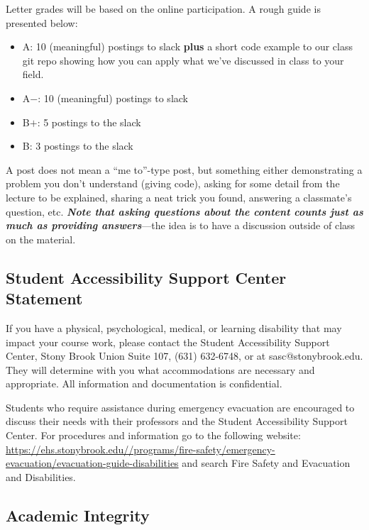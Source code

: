 \documentclass[10pt]{article}
\begin{document}
\noindent Letter grades will be based on the online participation.  A
rough guide is presented below:
\begin{itemize}
\item {\sf A\phantom{+}}: 10 (meaningful) postings to slack {\bf plus}
  a short code example to our class git repo showing how you can apply what
  we've discussed in class to your field.

\item {\sf A$-$}: 10 (meaningful) postings to slack

\item {\sf B$+$}: 5 postings to the slack

\item {\sf B\phantom{+}}:  3 postings to the slack
\end{itemize}
A post does not mean a ``me to''-type post, but something either
demonstrating a problem you don't understand (giving code), asking for
some detail from the lecture to be explained, sharing a neat trick you
found, answering a classmate's question, etc.  {\em \bfseries Note that asking
questions about the content counts just as much as providing
answers}---the idea is to have a discussion outside of class on the
material.



\subsection*{Student Accessibility Support Center Statement}

If you have a physical, psychological, medical, or learning disability
that may impact your course work, please contact the Student
Accessibility Support Center, Stony Brook Union Suite 107, (631)
632-6748, or at sasc@stonybrook.edu. They will determine with you what
accommodations are necessary and appropriate. All information and
documentation is confidential.

Students who require assistance during emergency evacuation are
encouraged to discuss their needs with their professors and the
Student Accessibility Support Center. For procedures and information
go to the following website:\\
{\small \url{https://ehs.stonybrook.edu//programs/fire-safety/emergency-evacuation/evacuation-guide-disabilities}}\linebreak
and search Fire Safety and Evacuation and Disabilities.


\subsection*{Academic Integrity}
\end{document}
